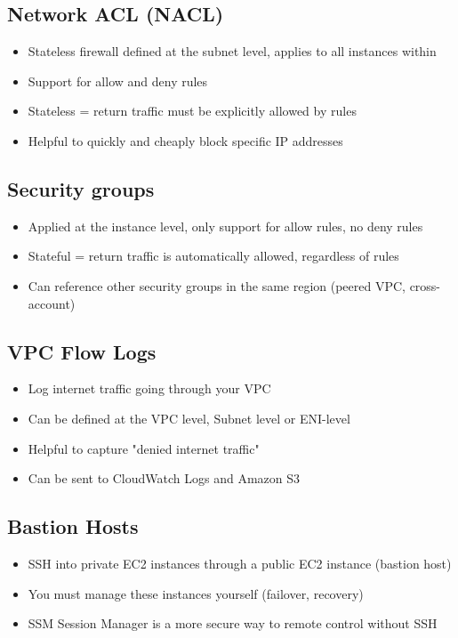 \subsection{Network ACL (NACL)}
\begin{itemize}
    \item Stateless firewall defined at the subnet level, applies to all instances within
    \item Support for allow and deny rules
    \item Stateless = return traffic must be explicitly allowed by rules
    \item Helpful to quickly and cheaply block specific IP addresses
\end{itemize}

\subsection{Security groups}
\begin{itemize}
    \item Applied at the instance level, only support for allow rules, no deny rules
    \item Stateful = return traffic is automatically allowed, regardless of rules
    \item Can reference other security groups in the same region (peered VPC, cross-account)
\end{itemize}

\subsection{VPC Flow Logs}
\begin{itemize}
    \item Log internet traffic going through your VPC
    \item Can be defined at the VPC level, Subnet level or ENI-level
    \item Helpful to capture "denied internet traffic"
    \item Can be sent to CloudWatch Logs and Amazon S3
\end{itemize}

\subsection{Bastion Hosts}
\begin{itemize}
    \item SSH into private EC2 instances through a public EC2 instance (bastion host)
    \item You must manage these instances yourself (failover, recovery)
    \item SSM Session Manager is a more secure way to remote control without SSH
\end{itemize}

